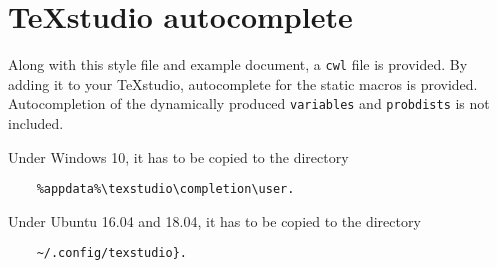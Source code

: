 \section{\TeX studio autocomplete}
Along with this style file and example document, a \verb|cwl| file is provided. 
By adding it to your \TeX studio, autocomplete for the static macros is provided. 
Autocompletion of the dynamically produced \verb|variables| and \verb|probdists| is not included.

Under Windows 10, it has to be copied to the directory 

\begin{Verbatim}
	%appdata%\texstudio\completion\user.
\end{Verbatim}

Under Ubuntu 16.04 and 18.04, it has to be copied to the directory 

\begin{Verbatim}
	~/.config/texstudio}.
\end{Verbatim} 